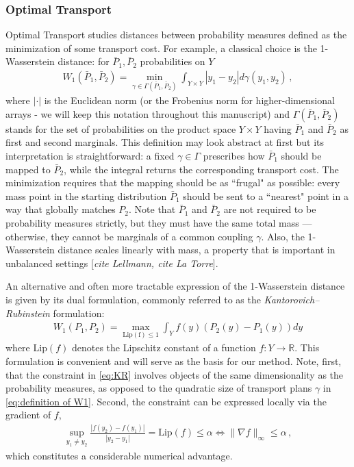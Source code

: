 \documentclass[journal,twoside,web]{ieeecolor}
\newcommand{\R}{\mathbb{R}}
\begin{document}
\subsubsection{Optimal Transport}
Optimal Transport studies distances between probability measures defined as the minimization of some transport cost. For example, a classical choice is the 1-Wasserstein distance: for $\bar{P}_1,\bar{P}_2$ probabilities on $Y$
\begin{align} \label{eq:definition of W1}
    W_1(\bar{P}_1,\bar{P}_2) = \min_{\gamma\in\Gamma(\bar{P}_1,\bar{P}_2)} \int_{Y\times Y}|y_1-y_2| d\gamma(y_1,y_2) \, ,
\end{align}
where $|\cdot|$ is the Euclidean norm (or the Frobenius norm for higher-dimensional arrays - we will keep this notation throughout this manuscript) and $\Gamma(\bar{P}_1,\bar{P}_2)$ stands for the set of probabilities on the product space $Y \times Y$ having $\bar{P}_1$ and $\bar{P}_2$ as first and second marginals. This definition may look abstract at first but its interpretation is straightforward: a fixed $\gamma\in\Gamma$ prescribes how $\bar{P}_1$ should be mapped to $\bar{P}_2$, while the integral returns the corresponding transport cost. The minimization requires that the mapping should be as ``frugal" as possible: every mass point in the starting distribution $\bar{P}_1$ should be sent to a ``nearest" point in a way that globally matches $P_2$. Note that $\bar{P}_1$ and $\bar{P}_2$ are not required to be probability measures strictly, but they must have the same total mass — otherwise, they cannot be marginals of a common coupling $\gamma$. Also, the 1-Wasserstein distance scales linearly with mass, a property that is important in unbalanced settings [\textit{cite Lellmann, cite La Torre}].

An alternative and often more tractable expression of the 1-Wasserstein distance is given by its dual formulation, commonly referred to as the \textit{Kantorovich–Rubinstein} formulation:
\begin{align} \label{eq:KR}
    W_1(P_1,P_2) = \max_{\mathrm{Lip(f)}\le 1} \int_Y f(y) (P_2(y)-P_1(y)) dy
\end{align}
where $\mathrm{Lip}(f)$ denotes the Lipschitz constant of a function $f:Y \to \R$. 
This formulation is convenient and will serve as the basis for our method. Note, first, that the constraint in \eqref{eq:KR} involves objects of the same dimensionality as the probability measures, as opposed to the quadratic size of transport plans $\gamma$
in \eqref{eq:definition of W1}. Second, the constraint can be expressed locally via the gradient of $f$,
\begin{align} \label{eq:constraint Lipschitz local}
    \sup_{y_1 \neq y_2} \frac{|f(y_2) - f(y_1)|}{|y_2 - y_1|} = \mathrm{Lip}(f) \le \alpha \iff \| \nabla f \|_\infty \le \alpha \, ,
\end{align}
which constitutes a considerable numerical advantage.
\end{document}
